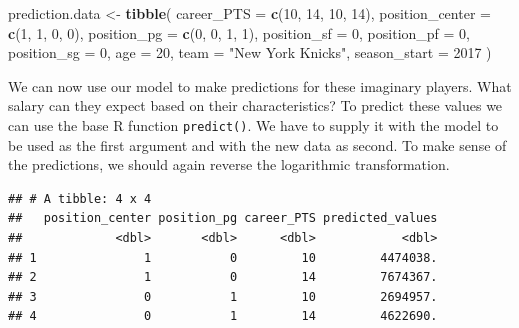 \documentclass[
]{book}
\newenvironment{Shaded}{\begin{snugshade}}{\end{snugshade}}
\newcommand{\AttributeTok}[1]{\textcolor[rgb]{0.13,0.29,0.53}{#1}}
\newcommand{\DecValTok}[1]{\textcolor[rgb]{0.00,0.00,0.81}{#1}}
\newcommand{\FunctionTok}[1]{\textcolor[rgb]{0.13,0.29,0.53}{\textbf{#1}}}
\newcommand{\NormalTok}[1]{#1}
\newcommand{\OtherTok}[1]{\textcolor[rgb]{0.56,0.35,0.01}{#1}}
\newcommand{\SpecialCharTok}[1]{\textcolor[rgb]{0.81,0.36,0.00}{\textbf{#1}}}
\newcommand{\StringTok}[1]{\textcolor[rgb]{0.31,0.60,0.02}{#1}}
\begin{document}
\begin{Shaded}
\begin{Highlighting}[]
\NormalTok{prediction.data }\OtherTok{\textless{}{-}} \FunctionTok{tibble}\NormalTok{(}
  \AttributeTok{career\_PTS =} \FunctionTok{c}\NormalTok{(}\DecValTok{10}\NormalTok{, }\DecValTok{14}\NormalTok{, }\DecValTok{10}\NormalTok{, }\DecValTok{14}\NormalTok{),}
  \AttributeTok{position\_center =} \FunctionTok{c}\NormalTok{(}\DecValTok{1}\NormalTok{, }\DecValTok{1}\NormalTok{, }\DecValTok{0}\NormalTok{, }\DecValTok{0}\NormalTok{),}
  \AttributeTok{position\_pg =} \FunctionTok{c}\NormalTok{(}\DecValTok{0}\NormalTok{, }\DecValTok{0}\NormalTok{, }\DecValTok{1}\NormalTok{, }\DecValTok{1}\NormalTok{),}
  \AttributeTok{position\_sf =} \DecValTok{0}\NormalTok{,}
  \AttributeTok{position\_pf =} \DecValTok{0}\NormalTok{,}
  \AttributeTok{position\_sg =} \DecValTok{0}\NormalTok{,}
  \AttributeTok{age =} \DecValTok{20}\NormalTok{,}
  \AttributeTok{team =} \StringTok{"New York Knicks"}\NormalTok{,}
  \AttributeTok{season\_start =} \DecValTok{2017}
\NormalTok{  )}
\end{Highlighting}
\end{Shaded}

We can now use our model to make predictions for these imaginary players. What
salary can they expect based on their characteristics? To predict these values
we can use the base R function \texttt{predict()}. We have to supply it with the model
to be used as the first argument and with the new data as second. To make
sense of the predictions, we should again reverse the logarithmic
transformation.

\begin{Shaded}
\end{Shaded}

\begin{verbatim}
## # A tibble: 4 x 4
##   position_center position_pg career_PTS predicted_values
##             <dbl>       <dbl>      <dbl>            <dbl>
## 1               1           0         10         4474038.
## 2               1           0         14         7674367.
## 3               0           1         10         2694957.
## 4               0           1         14         4622690.
\end{verbatim}
\end{document}
